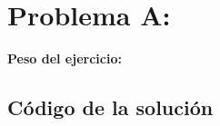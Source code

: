 \newpage{}
\section{Problema A: }
\textbf{Peso del ejercicio: }

\newpage
\subsection{Código de la solución}
\lstset{inputencoding=utf8/latin1}
%

